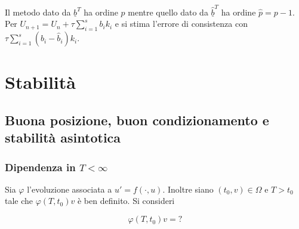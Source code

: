 \documentclass[hidelinks, 10pt]{report}
\begin{document}
Il metodo dato da $ \underline{b}^{T} $ ha ordine $ p $ mentre quello dato da $ \hat{\underline{b}}^{T} $ ha ordine $ \hat{p} = p - 1 $. Per $ U_{n + 1} = U_{n} + \tau \sum\limits_{i = 1}^{s} b_{i} k_{i} $ e si stima l'errore di consistenza con $ \tau \sum\limits_{i = 1}^{s} (b_{i} - \hat{b}_{i}) k_{i} $.

%
%

\chapter{Stabilit\`a}
\setcounter{section}{18}
\section{Buona posizione, buon condizionamento e stabilit\`a asintotica}
\subsection{Dipendenza in $ T < \infty $}

Sia $ \varphi $ l'evoluzione associata a $ u' = f(\cdot, u) $. Inoltre siano $ (t_{0}, v) \in \Omega $ e $ T > t_{0} $ tale che $ \varphi(T, t_{0}) v $ \`e ben definito. Si consideri

\begin{equation}	\label{eq:evol}
\varphi(T, t_{0}) v = ?
\end{equation}
\end{document}

